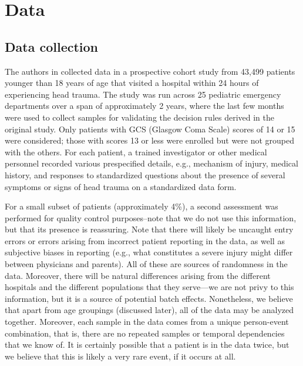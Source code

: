 \documentclass[11pt, letterpaper]{amsart}
\let\Oldsection\section
\renewcommand{\section}{\FloatBarrier\Oldsection}
\let\Oldsubsection\subsection
\renewcommand{\subsection}{\FloatBarrier\Oldsubsection}
\begin{document}
\section{Data}\label{sec:data}

\subsection{Data collection} \label{ssec:datacollect}


The authors in \cite{kuppermann2009identification} collected data in a prospective cohort study from 43,499 patients younger than 18 years of age that visited a hospital within 24 hours of experiencing head trauma. The study was run across 25 pediatric emergency departments over a span of approximately 2 years, where the last few months were used to collect samples for validating the decision rules derived in the original study. Only patients with GCS (Glasgow Coma Scale) scores of 14 or 15 were considered; those with scores 13 or less were enrolled but were not grouped with the others. For each patient, a trained investigator or other medical personnel recorded various prespecified details, e.g., mechanism of injury, medical history, and responses to standardized questions about the presence of several symptoms or signs of head trauma on a standardized data form. 

For a small subset of patients (approximately 4\%), a second assessment was performed for quality control purposes--note that we do not use this information, but that its presence is reassuring. Note that there will likely be uncaught entry errors or errors arising from incorrect patient reporting in the data, as well as subjective biases in reporting (e.g., what constitutes a severe injury might differ between physicians and parents). All of these are sources of randomness in the data. Moreover, there will be natural differences arising from the different hospitals and the different populations that they serve---we are not privy to this information, but it is a source of potential batch effects. Nonetheless, we believe that apart from age groupings (discussed later), all of the data may be analyzed together. Moreover, each sample in the data comes from a unique person-event combination, that is, there are no repeated samples or temporal dependencies that we know of. It is certainly possible that a patient is in the data twice, but we believe that this is likely a very rare event, if it occurs at all. 
\end{document}
